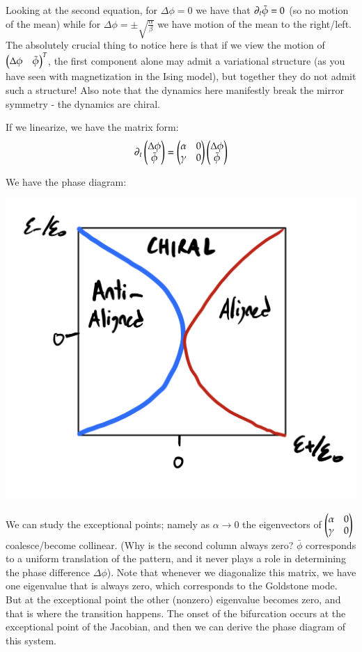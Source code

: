 Looking at the second equation, for $\Delta \phi = 0$ we have that $\partial_t \bar{\phi} = 0$ (so no motion of the mean) while for $\Delta \phi = \pm\sqrt{\frac{\alpha}{\beta}}$ we have motion of the mean to the right/left. The absolutely crucial thing to notice here is that if we view the motion of $\begin{pmatrix}\Delta \phi & \bar{\phi}\end{pmatrix}^T$, the first component alone may admit a variational structure (as you have seen with magnetization in the Ising model), but together they do not admit such a structure! Also note that the dynamics here manifestly break the mirror symmetry - the dynamics are chiral.

If we linearize, we have the matrix form:
\begin{equation}
    \partial_t \begin{pmatrix}\Delta \phi \\ \bar{\phi}\end{pmatrix} = \begin{pmatrix}\alpha & 0 \\ \gamma & 0\end{pmatrix}\begin{pmatrix}\Delta \phi \\ \bar{\phi}\end{pmatrix}
\end{equation}

We have the phase diagram:

\begin{center}
    \includegraphics[scale=0.35]{Lectures/Images/lec18-phasediagram.png}
\end{center}

We can study the exceptional points; namely as $\alpha \to 0$ the eigenvectors of $\begin{pmatrix}\alpha & 0 \\ \gamma & 0\end{pmatrix}$ coalesce/become collinear. (Why is the second column always zero? $\bar{\phi}$ corresponds to a uniform translation of the pattern, and it never plays a role in determining the phase difference $\Delta \phi$). Note that whenever we diagonalize this matrix, we have one eigenvalue that is always zero, which corresponds to the Goldstone mode. But at the exceptional point the other (nonzero) eigenvalue becomes zero, and that is where the transition happens. The onset of the bifurcation occurs at the exceptional point of the Jacobian, and then we can derive the phase diagram of this system.

